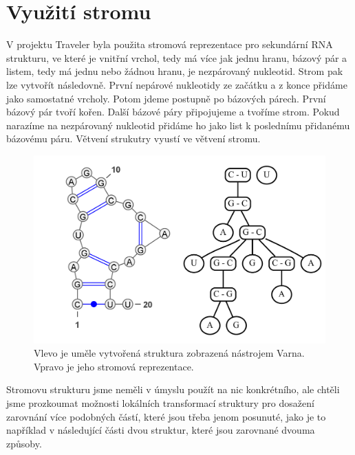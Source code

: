 \section{Využití stromu}

V projektu Traveler byla použita stromová reprezentace pro sekundární RNA
strukturu, ve které je vnitřní vrchol, tedy má více jak jednu hranu, bázový pár
a listem, tedy má jednu nebo žádnou hranu, je nezpárovaný nukleotid. Strom pak
lze vytvořít následovně. První nepárové nukleotidy ze začátku a z konce přidáme
jako samostatné vrcholy. Potom jdeme postupně po bázových párech. První bázový
pár tvoří kořen. Další bázové páry připojujeme a tvoříme strom. Pokud narazíme
na nezpárovaný nukleotid přidáme ho jako list k poslednímu přidanému bázovému
páru. Větvení strukutry vyustí ve větvení stromu. 

\begin{figure}[H]
  \centering
  \includegraphics[width=140mm]{../img/kap02/tree/tree.png}
  \caption{Vlevo je uměle vytvořená struktura zobrazená nástrojem Varna. Vpravo je jeho stromová reprezentace.}
\end{figure}

Stromovu strukturu jsme neměli v úmyslu použít na nic konkrétního, ale chtěli
jsme prozkoumat možnosti lokálních transformací struktury pro dosažení
zarovnání více podobných částí, které jsou třeba jenom posunuté, jako je to
například v následující části dvou struktur, které jsou zarovnané dvouma
způsoby.

